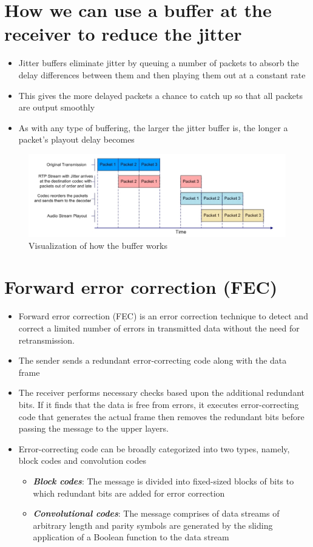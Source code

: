 \documentclass[11pt,a4paper]{report}
\begin{document}
	\section{How we can use a buffer at the receiver to reduce the jitter}
	\begin{itemize}
		\item Jitter buffers eliminate jitter by queuing a number of packets to absorb the delay differences between them and then playing them out at a constant rate
		\item This gives the more delayed packets a chance to catch up so that all packets are output smoothly
		\item As with any type of buffering, the larger the jitter buffer is, the longer a packet's playout delay becomes
	\end{itemize}
	\begin{figure}[h!]
  		\includegraphics[width=\linewidth]{buf-vis.png}
  		\caption{Visualization of how the buffer works}
  		\label{fig:bufvis}
	\end{figure}
	
	\section{Forward error correction (FEC)}
	\begin{itemize}
		\item Forward error correction (FEC) is an error correction technique to detect and correct a limited number of errors in transmitted data without the need for retransmission.
		\item The sender sends a redundant error-correcting code along with the data frame
		\item The receiver performs necessary checks based upon the additional redundant bits. If it finds that the data is free from errors, it executes error-correcting code that generates the actual frame then removes the redundant bits before passing the message to the upper layers.
		\item Error-correcting code can be broadly categorized into two types, namely, block codes and convolution codes
			\begin{itemize}
				\item \textbf{\emph{Block codes}}: The message is divided into fixed-sized blocks of bits to which redundant bits are added for error correction
				\item \textbf{\emph{Convolutional codes}}: The message comprises of data streams of arbitrary length and parity symbols are generated by the sliding application of a Boolean function to the data stream
			\end{itemize}
	\end{itemize}
	
\end{document}
